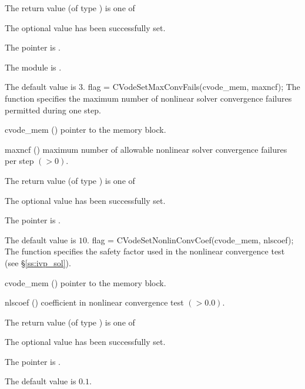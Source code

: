 {
  The return value  (of type ) is one of
  \begin{args}
  \item[\Id{CV\_SUCCESS}]
    The optional value has been successfully set.
  \item[\Id{CV\_MEM\_NULL}]
    The  pointer is .
  \item[\Id{CV\_MEM\_FAIL}]
    The {\sunnonlinsol} module is .
  \end{args}
}
{
  The default value is $3$.
}
{
flag = CVodeSetMaxConvFails(cvode\_mem, maxncf);
}
{
  The function  specifies the
  maximum number of nonlinear solver convergence failures permitted during
  one step.
}
{
  \begin{args}
  \item[cvode\_mem] ()
    pointer to the {\cvode} memory block.
  \item[maxncf] ()
    maximum number of allowable nonlinear solver convergence failures
    per step $( > 0)$.
  \end{args}
}
{
  The return value  (of type ) is one of
  \begin{args}
  \item[\Id{CV\_SUCCESS}]
    The optional value has been successfully set.
  \item[\Id{CV\_MEM\_NULL}]
    The  pointer is .
  \end{args}
}
{
  The default value is $10$.
}
{
flag = CVodeSetNonlinConvCoef(cvode\_mem, nlscoef);
}
{
  The function  specifies the safety factor used
  in the nonlinear convergence test (see \S\ref{ss:ivp_sol}).
}
{
  \begin{args}
  \item[cvode\_mem] ()
    pointer to the {\cvode} memory block.
  \item[nlscoef] ()
    coefficient in nonlinear convergence test $( > 0.0)$.
  \end{args}
}
{
  The return value  (of type ) is one of
  \begin{args}
  \item[\Id{CV\_SUCCESS}]
    The optional value has been successfully set.
  \item[\Id{CV\_MEM\_NULL}]
    The  pointer is .
  \end{args}
}
{
  The default value is $0.1$.
}


